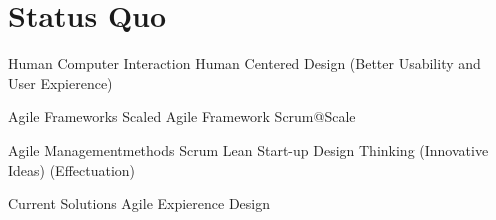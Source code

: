 \section*{Status Quo}

Human Computer Interaction
  Human Centered Design (Better Usability and User Expierence)

Agile Frameworks
  Scaled Agile Framework
  Scrum@Scale

Agile Managementmethods
  Scrum
  Lean Start-up
  Design Thinking (Innovative Ideas)
  (Effectuation)

Current Solutions
  Agile Expierence Design


